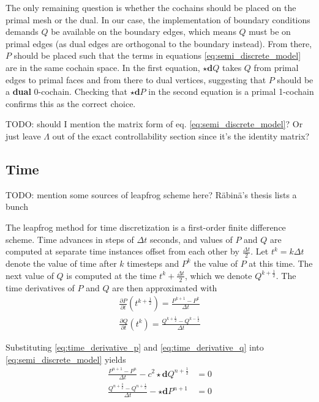 \documentclass[utf8,english]{gradu3}
\begin{document}
The only remaining question is whether the cochains should be placed
on the primal mesh or the dual.
In our case, the implementation of boundary conditions demands $Q$
be available on the boundary edges, which means $Q$ must be on primal edges
(as dual edges are orthogonal to the boundary instead).
From there, $P$ should be placed such that the terms in equations \eqref{eq:semi_discrete_model}
are in the same cochain space.
In the first equation, $\star\mathbf{d}Q$
takes $Q$ from primal edges to primal faces and from there to dual vertices,
suggesting that $P$ should be a \textbf{dual} 0-cochain.
Checking that $\star \mathbf{d} P$ in the second equation
is a primal 1-cochain confirms this as the correct choice.

TODO: should I mention the matrix form of eq. \eqref{eq:semi_discrete_model}?
Or just leave $\Lambda$ out of the exact controllability section
since it's the identity matrix?

\subsection{Time}

TODO: mention some sources of leapfrog scheme here? Räbinä's thesis lists a bunch

The leapfrog method for time discretization is a first-order finite difference scheme.
Time advances in steps of $\Delta t$ seconds,
and values of $P$ and $Q$ are computed at separate time instances
offset from each other by $\frac{\Delta t}{2}$.
Let $t^k = k\Delta t$ denote the value of time after $k$ timesteps
and $P^k$ the value of $P$ at this time.
The next value of $Q$ is computed at the time $t^k + \frac{\Delta t}{2}$,
which we denote $Q^{k+\frac{1}{2}}$.
The time derivatives of $P$ and $Q$ are then approximated with
\begin{eqnarray}
  \label{eq:time_derivative_p}
  \frac{\partial P}{\partial t}(t^{k+\frac{1}{2}}) = \frac{P^{k+1} - P^k}{\Delta t} \\
  \label{eq:time_derivative_q}
  \frac{\partial Q}{\partial t}(t^k) = \frac{Q^{k+\frac{1}{2}} - Q^{k-\frac{1}{2}}}{\Delta t}
\end{eqnarray}

Substituting \eqref{eq:time_derivative_p} and \eqref{eq:time_derivative_q}
into \eqref{eq:semi_discrete_model} yields
\begin{align*}
\frac{P^{n+1} - P^n}{\Delta t} - c^2 \star \mathbf{d} Q^{n+\frac{1}{2}} &= 0 \\
\frac{Q^{n+\frac{3}{2}} - Q^{n+\frac{1}{2}}}{\Delta t}
- \star \mathbf{d} P^{n+1} &= 0 \\
\end{align*}
\end{document}
